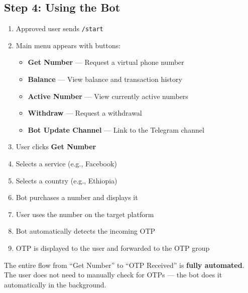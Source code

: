 \subsection{Step 4: Using the Bot}
\begin{enumerate}
    \item Approved user sends \texttt{/start}
    \item Main menu appears with buttons:
    \begin{itemize}
        \item \textbf{Get Number} --- Request a virtual phone number
        \item \textbf{Balance} --- View balance and transaction history
        \item \textbf{Active Number} --- View currently active numbers
        \item \textbf{Withdraw} --- Request a withdrawal
        \item \textbf{Bot Update Channel} --- Link to the Telegram channel
    \end{itemize}
    \item User clicks \textbf{Get Number}
    \item Selects a service (e.g., Facebook)
    \item Selects a country (e.g., Ethiopia)
    \item Bot purchases a number and displays it
    \item User uses the number on the target platform
    \item Bot automatically detects the incoming OTP
    \item OTP is displayed to the user and forwarded to the OTP group
\end{enumerate}

\begin{importantbox}
The entire flow from ``Get Number'' to ``OTP Received'' is \textbf{fully automated}. The user does not need to manually check for OTPs --- the bot does it automatically in the background.
\end{importantbox}
